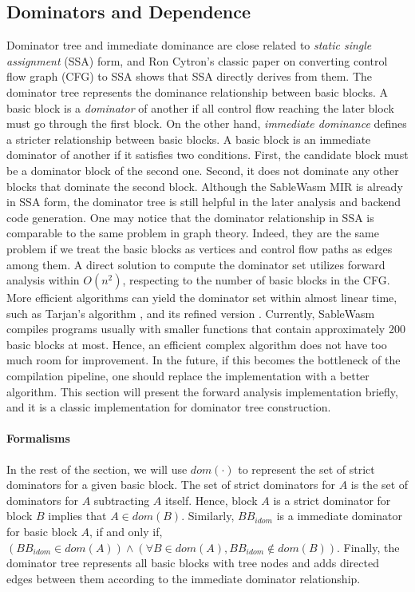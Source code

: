 \subsection{Dominators and Dependence}

Dominator tree and immediate dominance are close related to \emph{static single
    assignment} (SSA) form, and Ron Cytron's classic paper on converting
control flow graph (CFG) to SSA \cite{ibm-ssa} shows that SSA directly derives
from them. The dominator tree represents the dominance relationship between
basic blocks. A basic block is a \emph{dominator} of another if all control flow
reaching the later block must go through the first block. On the other hand,
\emph{immediate dominance} defines a stricter relationship between basic blocks.
A basic block is an immediate dominator of another if it satisfies two
conditions. First, the candidate block must be a dominator block of the second
one. Second, it does not dominate any other blocks that dominate the second
block. Although the SableWasm MIR is already in SSA form, the dominator tree is
still helpful in the later analysis and backend code generation. One may notice
that the dominator relationship in SSA is comparable to the same problem in
graph theory. Indeed, they are the same problem if we treat the basic blocks as
vertices and control flow paths as edges among them.  A direct solution to
compute the dominator set utilizes forward analysis within $O(n^2)$, respecting
to the number of basic blocks in the CFG. More efficient algorithms can yield
the dominator set within almost linear time, such as Tarjan's algorithm
\cite{tarjan-fast-dominator}, and its refined version
\cite{tarjan-fast-dominator-improved}. Currently, SableWasm compiles programs
usually with smaller functions that contain approximately 200 basic blocks at
most. Hence, an efficient complex algorithm does not have too much room for
improvement. In the future, if this becomes the bottleneck of the compilation
pipeline, one should replace the implementation with a better algorithm. This
section will present the forward analysis implementation briefly, and it is a
classic implementation for dominator tree construction.

\paragraph{Formalisms}
In the rest of the section, we will use $dom(\cdot)$ to represent the set of
strict dominators for a given basic block. The set of strict dominators for
$A$ is the set of dominators for $A$ subtracting $A$ itself. Hence, block $A$
is a strict dominator for block $B$ implies that $A \in dom(B)$. Similarly,
$BB_{idom}$ is a immediate dominator for basic block $A$, if and only if,
$(BB_{idom} \in dom(A)) \land (\forall B \in dom(A), BB_{idom} \notin dom(B))$.
Finally, the dominator tree represents all basic blocks with tree nodes and adds
directed edges between them according to the immediate dominator relationship.


